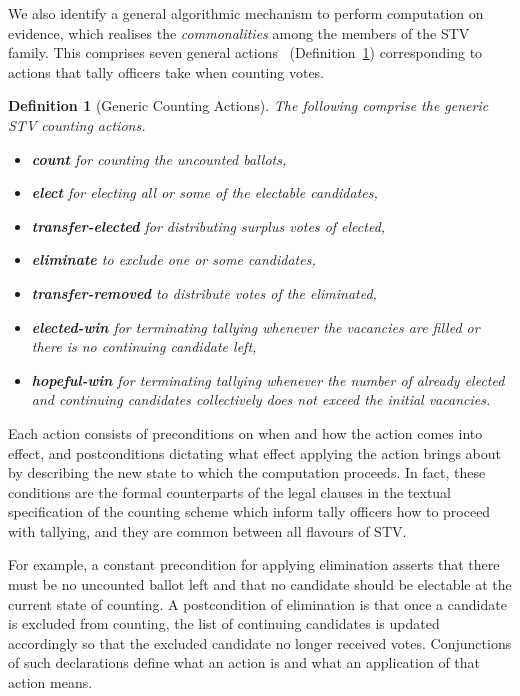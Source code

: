 \documentclass[10pt,conference]{IEEEtran}
\newtheorem{definition}{Definition}
\begin{document}
We also identify a general algorithmic mechanism to perform
computation on evidence, which realises the \emph{commonalities}
among the members of the STV family. This comprises seven general actions%
~(Definition~\ref{transitions}) corresponding to actions that tally officers take when counting votes.
\begin{definition}[Generic Counting Actions]\label{transitions}
 The following comprise the generic STV counting actions.
 \begin{itemize}
\item\textbf{count} for counting the uncounted ballots,
\item\textbf{elect} for electing all or some of the electable candidates, 
\item\textbf{transfer-elected} for distributing surplus votes of elected, %
\item\textbf{eliminate} to exclude one or some candidates, 
\item\textbf{transfer-removed} to distribute votes of   the eliminated, %
\item\textbf{elected-win} for terminating tallying whenever the vacancies are filled or there is no continuing candidate left, 
\item\textbf{hopeful-win} for terminating tallying whenever  the number of already elected and continuing candidates collectively does not exceed the initial vacancies. 
\end{itemize}
\end{definition}
Each action consists of  preconditions on when and how the action
comes into effect, and postconditions dictating what effect applying
the action brings about by describing the new state to which the
computation proceeds. In fact, these conditions are the formal
counterparts of the legal clauses in the textual specification of
the counting scheme which inform tally officers how to proceed with tallying, and they are common between all flavours of STV. 

For example, a constant precondition for applying elimination
asserts that there must be no uncounted ballot left and that no
candidate should be electable at the current state of counting. A
postcondition of elimination is that once a candidate is excluded
from counting, the list of continuing candidates is updated
accordingly so that the excluded candidate no longer received votes.
Conjunctions of such declarations define what an action is and what an application of that action means.
\end{document}
